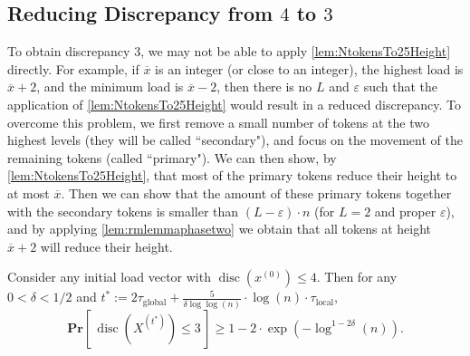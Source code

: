 \documentclass[twoside,leqno]{article}
\newcommand{\Pro}[1]{\mathbf{Pr} \left[\,#1\,\right]}
\DeclareMathOperator{\discr}{\mathrm{disc}}
\DeclareMathOperator{\1}{\mathbf{1}}
\newcommand{\taulocal}{\tau_{\mathrm{local}}}
\newcommand{\tauglobal}{\tau_{\mathrm{global}}}
\numberwithin{equation}{section}
\let\epsilon\varepsilon
\begin{document}
\subsection{Reducing Discrepancy from $4$ to $3$}\label{Sec:ReduceTo3}

To obtain discrepancy $3$, we may not be able to apply \cref{lem:NtokensTo25Height} directly. For example, if $\overline{x}$ is an integer (or close to an integer), the highest load is 
$\overline{x}+2$, and the minimum load is $\overline{x}-2$, then there is no $L$ and $\epsilon$ such that the application of \cref{lem:NtokensTo25Height} would result in a reduced discrepancy. To overcome this problem, we first remove a small number of tokens at the two highest levels (they will be called ``secondary"), and focus on the movement of the remaining tokens (called ``primary"). We can then show, by \cref{lem:NtokensTo25Height}, that most of the primary tokens reduce their height to at most $\overline{x}$. Then we can show that the amount of these primary tokens together with the secondary tokens is smaller than $(L-\epsilon) \cdot n$ (for $L=2$ and proper $\epsilon$), and by applying \cref{lem:rmlemmaphasetwo} we obtain that all tokens at height $\overline{x}+2$ will reduce their height. 


\begin{lemma}\label{reductiontothree}
Consider any initial load vector with $\discr(x^{(0)}) \leq 4$.
Then for any $0 < \delta < 1/2$ and $t^*:=2 \tauglobal + \frac{5}{\delta \log \log(n)} \cdot \log(n) \cdot \taulocal$,
\[
\Pro{\discr (X^{(t^*)}) \leq 3 } \geq 1 - 2 \cdot \exp\left( -\log^{1-2  \delta} (n) \right).
\]
\end{lemma}
\end{document}
